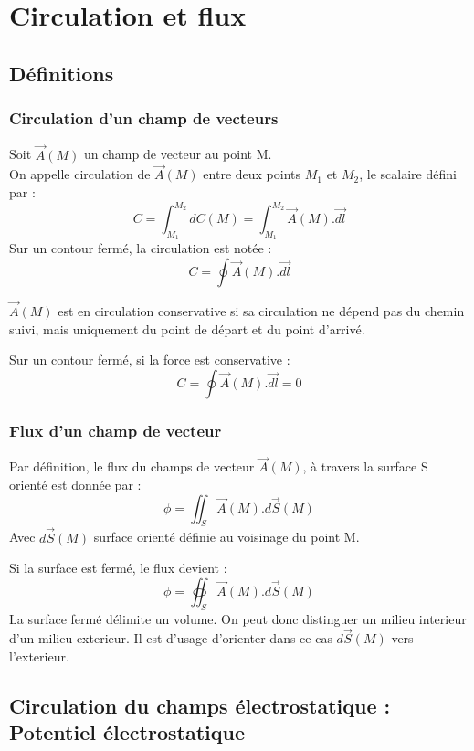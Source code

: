 \chapter{Circulation et flux}
\section{Définitions}
\subsection{Circulation d'un champ de vecteurs}
\begin{de}
Soit $\overrightarrow{A}(M)$ un champ de vecteur au point M.\\
On appelle circulation de $\overrightarrow{A}(M)$ entre deux points $M_1$ et $M_2$, le scalaire défini par : 
$$C = \int_{M_1}^{M_2} dC(M) = \int_{M_1}^{M_2} \overrightarrow{A}(M).\overrightarrow{dl}$$
Sur un contour fermé, la circulation est notée :
$$C = \oint\overrightarrow{A}(M).\overrightarrow{dl}$$
\end{de}
\begin{de}
$\overrightarrow{A}(M)$ est en circulation conservative si sa circulation ne dépend pas du chemin suivi, mais uniquement du point de départ et du point d'arrivé.
\end{de}
\begin{prop}
Sur un contour fermé, si la force est conservative :
$$C = \oint \overrightarrow{A}(M).\overrightarrow{dl} = 0$$
\end{prop}
\subsection{Flux d'un champ de vecteur}
\begin{de}
Par définition, le flux du champs de vecteur $\overrightarrow{A}(M)$, à travers la surface S orienté est donnée par : 
$$\phi = \iint_S \overrightarrow{A}(M).d\overrightarrow{S}(M)$$
Avec $d\overrightarrow{S}(M)$ surface orienté définie au voisinage du point M.
\end{de}
\begin{de}
Si la surface est fermé, le flux devient : 
$$\phi = \oiint_S \overrightarrow{A}(M).d\overrightarrow{S}(M)$$
La surface fermé délimite un volume. On peut donc distinguer un milieu interieur d'un milieu exterieur. Il est d'usage d'orienter dans ce cas $d\overrightarrow{S}(M)$ vers l'exterieur.
\end{de}
\section{Circulation du champs électrostatique : Potentiel électrostatique}
